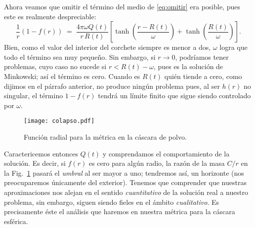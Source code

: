 \documentclass[12pt]{article}
\begin{document}
Ahora veamos que omitir el término del medio de \eqref{eq:omitir} era posible, pues este es realmente despreciable:
$$ \frac{1}{r}\left(1 - f(r)\right) \;=\; \frac{4\pi\omega Q(t)}{r\,R(t)} \left[\tanh\!\left(\frac{r - R(t)}{\omega}\right) + \tanh\!\left(\frac{R(t)}{\omega}\right) \right]. $$
Bien, como el valor del interior del corchete siempre es menor a dos, $\omega$ logra que todo el término sea muy pequeño. Sin embargo, si $r \to 0$, podríamos tener problemas, cuyo caso no sucede si $r < R(t) - \omega$, pues es la solución de Minkowski; así el término es cero. Cuando es $R(t)$ quién tiende a cero, como dijimos en el párrafo anterior, no produce ningún problema pues, al ser $h(r)$ no singular, el término $1 - f(r)$ tendrá un límite finito que sigue siendo controlado por $\omega$.

\begin{figure}[ht]
  \begin{center}
    \texttt{[image: colapso.pdf]}
    \caption{Función radial para la métrica en la cáscara de polvo.}
  \end{center}
  \label{fig:pegado}
\end{figure}

Caractericemos entonces $Q(t)$ y comprendamos el comportamiento de la solución. Es decir, si $f(r)$ es cero para algún radio, la razón de la masa $C/r$ en la Fig.~\ref{fig:pegado} pasará el \textit{umbral} al ser mayor a uno; tendremos así, un horizonte (nos preocuparemos únicamente del exterior). Tenemos que comprender que nuestras aproximaciones nos alejan en el sentido \emph{cuantitativo} de la solución real a nuestro problema, sin embargo, siguen siendo fieles en el ámbito \emph{cualitativo}. Es precisamente éste el análisis que haremos en nuestra métrica para la cáscara esférica.
\end{document}
